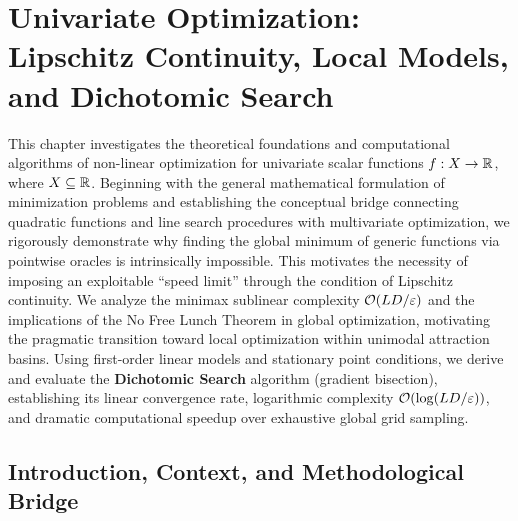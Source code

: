 \chapter[Univariate Optimization: Lipschitz, Local Models, and Dichotomic Search]{Univariate Optimization:\\Lipschitz Continuity, Local Models, and Dichotomic Search}
\label{chap:univariate-optimization-lipschitz-dichotomic}

This chapter investigates the theoretical foundations and computational algorithms of non-linear optimization for univariate scalar functions $f: X \to \mathbb{R}$, where $X \subseteq \mathbb{R}$. Beginning with the general mathematical formulation of minimization problems and establishing the conceptual bridge connecting quadratic functions and line search procedures with multivariate optimization, we rigorously demonstrate why finding the global minimum of generic functions via pointwise oracles is intrinsically impossible. This motivates the necessity of imposing an exploitable ``speed limit'' through the condition of Lipschitz continuity. We analyze the minimax sublinear complexity $\mathcal{O}\!\left(LD/\varepsilon\right)$ and the implications of the No Free Lunch Theorem in global optimization, motivating the pragmatic transition toward local optimization within unimodal attraction basins. Using first-order linear models and stationary point conditions, we derive and evaluate the \textbf{Dichotomic Search} algorithm (gradient bisection), establishing its linear convergence rate, logarithmic complexity $\mathcal{O}\!\left(\log(LD/\varepsilon)\right)$, and dramatic computational speedup over exhaustive global grid sampling.

\FloatBarrier
\section{Introduction, Context, and Methodological Bridge}
\label{sec:univariate-intro-context-en}

